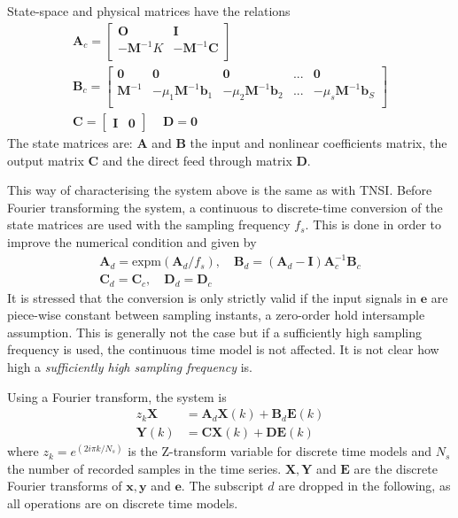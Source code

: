 State-space and physical matrices have the relations
\begin{equation}
  \label{eq:state_to_physical_mat}
  \begin{gathered}
  \bm A_c =
  \begin{bmatrix}
    \bm O  & \bm I \\
    -\bm M^{-1}K     & -\bm M^{-1} \bm C \\
  \end{bmatrix}
  \\
  \bm B_c =
  \begin{bmatrix}
    \bm 0 & \bm 0 & \bm 0 & ... & \bm 0 \\
    \bm M^{-1}  & -\mu_1 \bm M^{-1} \bm b_1 & -\mu_2 \bm M^{-1} \bm b_2 & ... &
    -\mu_s \bm M^{-1} \bm b_S \\
  \end{bmatrix}
  \\
  \bm C =
  \begin{bmatrix}
    \bm I & \bm 0
  \end{bmatrix}
  \,\quad
  \bm D = \bm 0
\end{gathered}
\end{equation}
The state matrices are: $\bm A$ and $\bm B$ the input and nonlinear coefficients
matrix, the output matrix $\bm C$ and the direct feed through matrix $\bm D$.

This way of characterising the system above is the same as with TNSI. Before
Fourier transforming the system, a continuous to discrete-time conversion of the
state matrices are used with the sampling frequency $f_s$. This is done in order
to improve the numerical condition and given by
\begin{equation}
  \begin{gathered}
    \bm A_d = \text{expm}(\bm A_d/f_s) ,\quad
    \bm B_d = (\bm A_d - \bm I)\bm A_c^{-1} \bm B_c \\
    \bm C_d = \bm C_c ,\quad \bm D_d = \bm D_c
  \end{gathered}
\end{equation}
It is stressed\autocite{noel2013a} that the conversion is only strictly valid if
the input signals in $\bm e$ are piece-wise constant between sampling instants,
a zero-order hold intersample assumption. This is generally not the case but if
a sufficiently high sampling frequency is used, the continuous time model is not
affected. It is not clear how high a \textit{sufficiently high sampling
  frequency} is.

Using a Fourier transform, the system is
\begin{equation}
  \label{eq:fnsi_freq_state}
  \begin{aligned}
    z_k \bm X &= \bm A_d \bm X(k) + \bm B_d \bm E(k) \\
    \bm Y(k) &= \bm C \bm X(k) + \bm D \bm E(k)
\end{aligned}
\end{equation}
where $z_k = e^{(2i\pi k/N_s)}$ is the Z-transform variable for discrete time
models and $N_s$ the number of recorded samples in the time series. $\bm X, \bm
Y$ and $\bm E$ are the discrete Fourier transforms of $\bm x, \bm y$ and $\bm
e$. The subscript $d$ are dropped in the following, as all operations are on
discrete time models.

